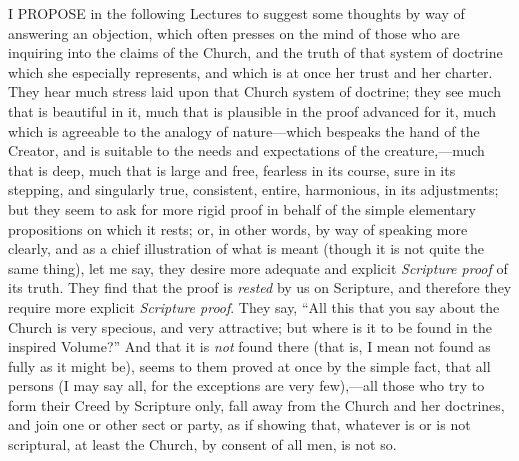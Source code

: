 I PROPOSE in the following Lectures to suggest some thoughts
by way of answering an objection, which often presses on the mind of
those who are inquiring into the claims of the Church, and the truth
of that system of doctrine which she especially represents, and which
is at once her trust and her charter. They hear much stress laid upon
that Church system of doctrine; they see much that is beautiful in it,
much that is plausible in the proof advanced for it, much which is
agreeable to the analogy of nature—which bespeaks the hand of the
Creator, and is suitable to the needs and expectations of the
creature,—much that is deep, much that is large and free, fearless
in its course, sure in its stepping, and singularly true, consistent,
entire, harmonious, in its adjustments; but they seem to ask for more
rigid proof in behalf of the simple elementary propositions on which
it rests; or, in other words, by way of speaking more clearly, and as
a chief illustration of what is meant (though it is not quite
the same thing), let me say, they desire more adequate and explicit \emph{Scripture
proof} of its truth. They find that the proof is \emph{rested} by
us on Scripture, and therefore they require more explicit \emph{Scripture
proof}. They say, ``All this that you say about the Church is
very specious, and very attractive; but where is it to be found in the
inspired Volume?'' And that it is \emph{not} found there (that is, I mean
not found as fully as it might be), seems to them proved at once by
the simple fact, that all persons (I may say all, for the exceptions
are very few),—all those who try to form their Creed by Scripture
only, fall away from the Church and her doctrines, and join one or
other sect or party, as if showing that, whatever is or is not
scriptural, at least the Church, by consent of all men, is not so.


